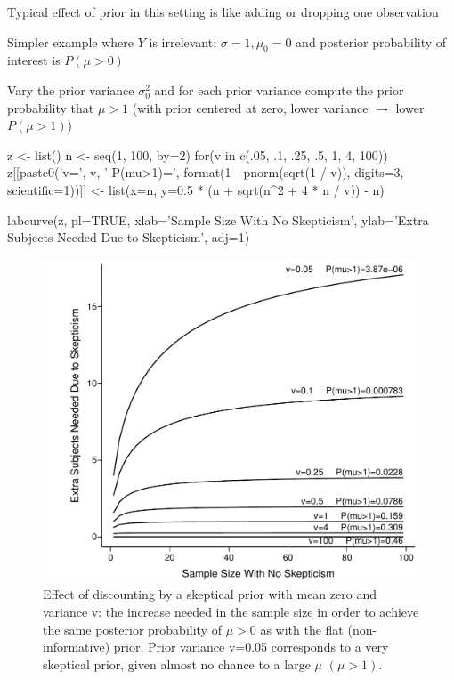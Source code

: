 \item Typical effect of prior in this setting is like adding or dropping one observation
\item Simpler example where $\overline{Y}$ is irrelevant: $\sigma=1, \mu_{0}=0$ and posterior probability of interest is $P(\mu > 0)$
\item Vary the prior variance $\sigma^{2}_{0}$ and for each prior variance compute the prior probability that $\mu > 1$ (with prior centered at zero, lower variance $\rightarrow$ lower $P(\mu > 1)$)
\begin{Schunk}
\begin{Sinput}
z <- list()
n <- seq(1, 100, by=2)
for(v in c(.05, .1, .25, .5, 1, 4, 100))
  z[[paste0('v=', v, '     P(mu>1)=',
            format(1 - pnorm(sqrt(1 / v)), digits=3, scientific=1))]] <-
        list(x=n, y=0.5 * (n + sqrt(n^2 + 4 * n / v)) - n)

labcurve(z, pl=TRUE, xlab='Sample Size With No Skepticism',
         ylab='Extra Subjects Needed Due to Skepticism', adj=1)
\end{Sinput}
\begin{figure}[htbp]

\centerline{\includegraphics[width=\maxwidth]{htest-skepn-1} }

\caption[Effect of discounting by a skeptical prior]{Effect of discounting by a skeptical prior with mean zero and variance v: the increase needed in the sample size in order to achieve the same posterior probability of $\mu > 0$ as with the flat (non-informative) prior.  Prior variance v=0.05 corresponds to a very skeptical prior, given almost no chance to a large $\mu$ $(\mu > 1)$.}\label{fig:htest-skepn}
\end{figure}
\end{Schunk}

